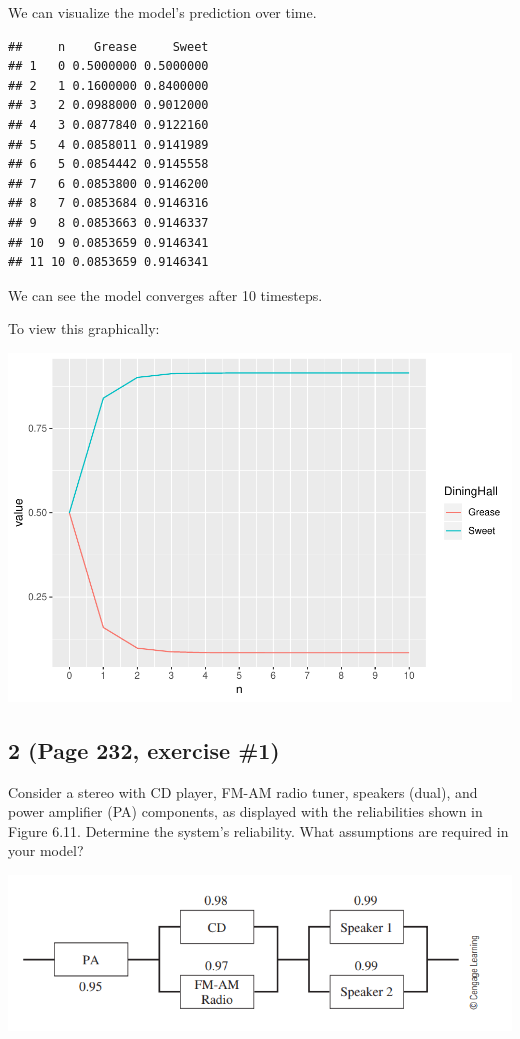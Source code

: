 \documentclass[]{article}
\begin{document}
We can visualize the model's prediction over time.

\begin{verbatim}
##     n    Grease     Sweet
## 1   0 0.5000000 0.5000000
## 2   1 0.1600000 0.8400000
## 3   2 0.0988000 0.9012000
## 4   3 0.0877840 0.9122160
## 5   4 0.0858011 0.9141989
## 6   5 0.0854442 0.9145558
## 7   6 0.0853800 0.9146200
## 8   7 0.0853684 0.9146316
## 9   8 0.0853663 0.9146337
## 10  9 0.0853659 0.9146341
## 11 10 0.0853659 0.9146341
\end{verbatim}

We can see the model converges after 10 timesteps.

To view this graphically:

\includegraphics{Joshua_Sturm_Homework5_files/figure-latex/unnamed-chunk-4-1.pdf}

\hypertarget{page-232-exercise-1}{%
\subsection{2 (Page 232, exercise \#1)}\label{page-232-exercise-1}}

Consider a stereo with CD player, FM-AM radio tuner, speakers (dual),
and power amplifier (PA) components, as displayed with the reliabilities
shown in Figure 6.11. Determine the system's reliability. What
assumptions are required in your model?

\includegraphics{image2.png}
\end{document}
